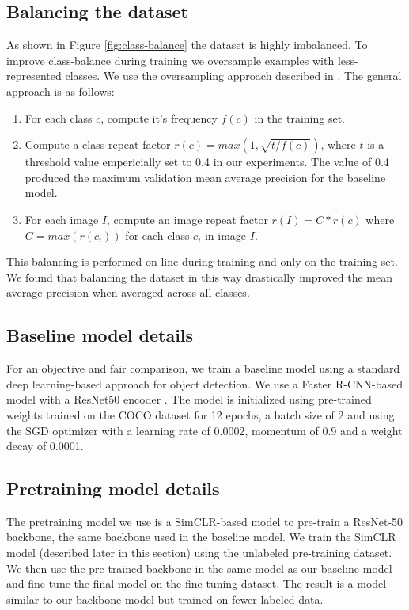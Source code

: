 \documentclass[conference]{IEEEtran}
\begin{document}
\subsection{Balancing the dataset}

As shown in Figure \ref{fig:class-balance} the dataset is highly imbalanced. To improve class-balance during training we oversample examples with less-represented classes. We use the oversampling approach described in \cite{gupta2019lvis}. The general approach is as follows:

\begin{enumerate}
\item For each class $c$, compute it's frequency $f(c)$ in the training set.
\item Compute a class repeat factor $r(c) = max(1, \sqrt{{t}/{f(c)}})$, where $t$ is a threshold value empericially set to 0.4 in our experiments. The value of 0.4 produced the maximum validation mean average precision for the baseline model.
\item For each image $I$, compute an image repeat factor $r(I) = C * r(c)$ where $C = max(r(c_i))$ for each class $c_i$ in image $I$.
\end{enumerate}

This balancing is performed on-line during training and only on the training set. We found that balancing the dataset in this way drastically improved the mean average precision when averaged across all classes.

\subsection{Baseline model details}

For an objective and fair comparison, we train a baseline model using a standard deep learning-based approach for object detection. We use a Faster R-CNN-based model \cite{DBLP:conf/nips/RenHGS15} with a ResNet50 encoder \cite{He_2016_CVPR}. The model is initialized using pre-trained weights trained on the COCO dataset for 12 epochs, a batch size of 2 and using the SGD optimizer with a learning rate of 0.0002, momentum of 0.9 and a weight decay of 0.0001.

\subsection{Pretraining model details}

The pretraining model we use is a SimCLR-based model \cite{chenSimpleFrameworkContrastive2020} to pre-train a ResNet-50 backbone, the same backbone used in the baseline model. We train the SimCLR model (described later in this section) using the unlabeled pre-training dataset. We then use the pre-trained backbone in the same model as our baseline model and fine-tune the final model on the fine-tuning dataset. The result is a model similar to our backbone model but trained on fewer labeled data.
\end{document}
